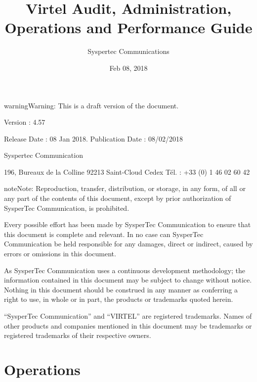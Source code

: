 \documentclass[letterpaper,10pt,english]{sphinxmanual}
\title{Virtel Audit, Administration, Operations and Performance Guide}
\date{Feb 08, 2018}
\author{Syspertec Communications}
\begin{document}
\maketitle
\sphinxtableofcontents
{}\label{\detokenize{audit_operations_ and_performance::doc}}




\begin{sphinxadmonition}{warning}{Warning:}
This is a draft version of the document.
\end{sphinxadmonition}

Version : 4.57

Release Date : 08 Jan 2018. Publication Date : 08/02/2018

Syspertec Communication

196, Bureaux de la Colline 92213 Saint-Cloud Cedex Tél. : +33 (0) 1 46 02 60 42


\begin{sphinxadmonition}{note}{Note:}
Reproduction, transfer, distribution, or storage, in any form, of all or any part of
the contents of this document, except by prior authorization of SysperTec
Communication, is prohibited.

Every possible effort has been made by SysperTec Communication to ensure that this document
is complete and relevant. In no case can SysperTec Communication be held responsible for
any damages, direct or indirect, caused by errors or omissions in this document.

As SysperTec Communication uses a continuous development methodology; the information
contained in this document may be subject to change without notice. Nothing in this
document should be construed in any manner as conferring a right to use, in whole or in
part, the products or trademarks quoted herein.

“SysperTec Communication” and “VIRTEL” are registered trademarks. Names of other products
and companies mentioned in this document may be trademarks or registered trademarks of
their respective owners.
\end{sphinxadmonition}


\chapter{Operations}
\label{\detokenize{audit_operations_ and_performance:operations}}\label{\detokenize{audit_operations_ and_performance:virtel457ap}}\label{\detokenize{audit_operations_ and_performance:audit-administration-operations-and-performance-v4-57}}\label{\detokenize{audit_operations_ and_performance:v457ap-introduction}}
\end{document}
